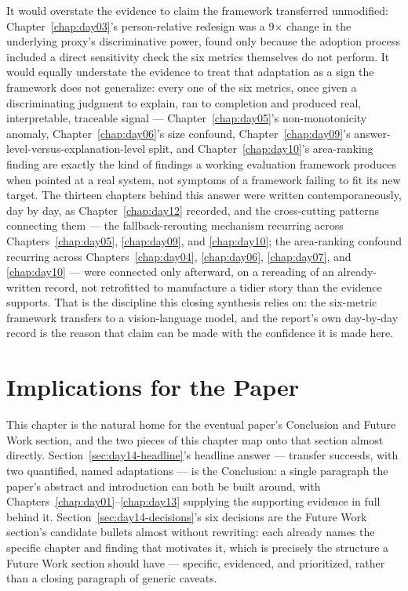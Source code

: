 It would overstate the evidence to claim the framework transferred unmodified: Chapter~\ref{chap:day03}'s
person-relative redesign was a 9$\times$ change in the underlying proxy's discriminative power,
found only because the adoption process included a direct sensitivity check the six metrics
themselves do not perform. It would equally understate the evidence to treat that adaptation as
a sign the framework does not generalize: every one of the six metrics, once given a
discriminating judgment to explain, ran to completion and produced real, interpretable,
traceable signal --- Chapter~\ref{chap:day05}'s non-monotonicity anomaly, Chapter~\ref{chap:day06}'s
size confound, Chapter~\ref{chap:day09}'s answer-level-versus-explanation-level split, and
Chapter~\ref{chap:day10}'s area-ranking finding are exactly the kind of findings a working
evaluation framework produces when pointed at a real system, not symptoms of a framework
failing to fit its new target. The thirteen chapters behind this answer were written
contemporaneously, day by day, as Chapter~\ref{chap:day12} recorded, and the cross-cutting
patterns connecting them --- the fallback-rerouting mechanism recurring across
Chapters~\ref{chap:day05}, \ref{chap:day09}, and \ref{chap:day10}; the area-ranking confound
recurring across Chapters~\ref{chap:day04}, \ref{chap:day06}, \ref{chap:day07}, and
\ref{chap:day10} --- were connected only afterward, on a rereading of an already-written
record, not retrofitted to manufacture a tidier story than the evidence supports. That is the
discipline this closing synthesis relies on: the six-metric framework transfers to a
vision-language model, and the report's own day-by-day record is the reason that claim can be
made with the confidence it is made here.

\section{Implications for the Paper}

This chapter is the natural home for the eventual paper's Conclusion and Future Work section,
and the two pieces of this chapter map onto that section almost directly. Section~\ref{sec:day14-headline}'s
headline answer --- transfer succeeds, with two quantified, named adaptations --- is the
Conclusion: a single paragraph the paper's abstract and introduction can both be built around,
with Chapters~\ref{chap:day01}--\ref{chap:day13} supplying the supporting evidence in full
behind it. Section~\ref{sec:day14-decisions}'s six decisions are the Future Work section's
candidate bullets almost without rewriting: each already names the specific chapter and finding
that motivates it, which is precisely the structure a Future Work section should have ---
specific, evidenced, and prioritized, rather than a closing paragraph of generic caveats.

